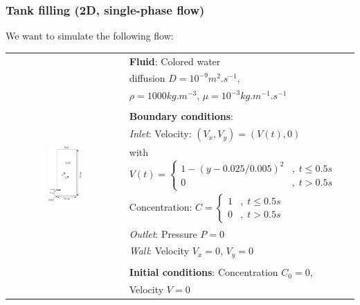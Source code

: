 \documentclass[10pt, hyperref={unicode=true,pdfusetitle, bookmarks=true,bookmarksnumbered=false,bookmarksopen=false, breaklinks=false,pdfborder={0 0 1},backref=true,colorlinks=true,linkcolor=darkblue,pageanchor}]{beamer}
\begin{document}
\begin{frame}
\frametitle{Tank filling (2D, single-phase flow)}
\begin{block}{We want to simulate the following flow:}

\begin{tabular}{cl}
\multirow{14}{*}{\includegraphics[width=0.3\textwidth]{PICTURES/tank2D.pdf}} & \textbf{Fluid}: Colored water \tabularnewline
 & diffusion $D=10^{-9}m^{2}.s^{-1}$, \tabularnewline
 & $\rho=1000kg.m^{-3}$, $\mu=10^{-3}kg.m^{-1}.s^{-1}$\tabularnewline

 & \tabularnewline

 & \textbf{Boundary conditions}:\tabularnewline

 & \textit{Inlet}: Velocity: $(V_{x},V_{y})=(V(t),0)$  \tabularnewline
 & with $V(t)=
    \begin{cases}
    1-(y-0.025/0.005)^{2} & ,\; t\leq0.5s\\
    0 & ,\; t>0.5s
    \end{cases}$ \tabularnewline

 & Concentration: $C=
    \begin{cases} 
    1 & ,\; t\leq0.5s\\
    0 & ,\; t>0.5s
    \end{cases}$ \tabularnewline
 & \textit{Outlet}: Pressure $P=0$\tabularnewline
 & \textit{Wall}: Velocity $V_{x}=0$, $V_{y}=0$ \tabularnewline

 & \tabularnewline

 & \textbf{Initial conditions}: Concentration $C_0=0$, \tabularnewline
 & Velocity $V=0$ \tabularnewline
\end{tabular}

\end{block}
\end{frame}
\end{document}
